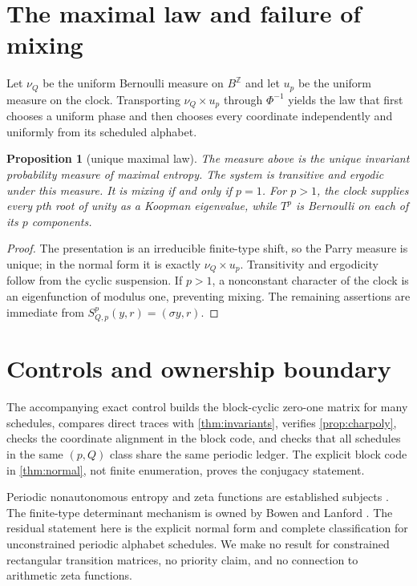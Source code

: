 \documentclass[11pt,a4paper]{amsart}
\newtheorem{proposition}[theorem]{Proposition}
\theoremstyle{definition}
\theoremstyle{remark}
\newcommand{\Z}{\mathbb Z}
\begin{document}
\section{The maximal law and failure of mixing}

Let $\nu_Q$ be the uniform Bernoulli measure on $B^\Z$ and let $u_p$ be the
uniform measure on the clock.  Transporting $\nu_Q\times u_p$ through
$\Phi^{-1}$ yields the law that first chooses a uniform phase and then chooses
every coordinate independently and uniformly from its scheduled alphabet.

\begin{proposition}[unique maximal law]\label{prop:mme}
The measure above is the unique invariant probability measure of maximal
entropy.  The system is transitive and ergodic under this measure.  It is
mixing if and only if $p=1$.  For $p>1$, the clock supplies every $p$th root
of unity as a Koopman eigenvalue, while $T^p$ is Bernoulli on each of its
$p$ components.
\end{proposition}

\begin{proof}
The presentation is an irreducible finite-type shift, so the Parry measure is
unique; in the normal form it is exactly $\nu_Q\times u_p$.  Transitivity and
ergodicity follow from the cyclic suspension.  If $p>1$, a nonconstant
character of the clock is an eigenfunction of modulus one, preventing
mixing.  The remaining assertions are immediate from
$S_{Q,p}^p(y,r)=(\sigma y,r)$.
\end{proof}

\section{Controls and ownership boundary}

The accompanying exact control builds the block-cyclic zero-one matrix for
many schedules, compares direct traces with \cref{thm:invariants}, verifies
\cref{prop:charpoly}, checks the coordinate alignment in the block code, and
checks that all schedules in the same $(p,Q)$ class share the same periodic
ledger.  The explicit block code in
\cref{thm:normal}, not finite enumeration, proves the conjugacy statement.

Periodic nonautonomous entropy and zeta functions are established subjects
\cite{AlvesMalek2013}.  The finite-type determinant mechanism is owned by
Bowen and Lanford \cite{BowenLanford1970}.  The residual statement here is
the explicit normal form and complete classification for unconstrained
periodic alphabet schedules.  We make no result for constrained rectangular
transition matrices, no priority claim, and no connection to arithmetic
zeta functions.



\end{document}

